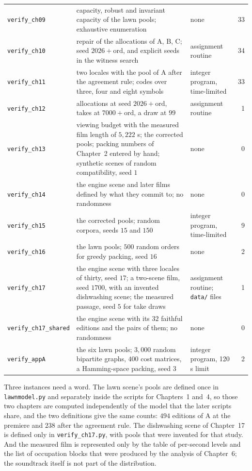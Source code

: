 \documentclass[11pt,twoside,openright]{book}
\theoremstyle{plain}
\theoremstyle{definition}
\theoremstyle{remark}
\begin{document}
\begin{longtable}{@{}>{\raggedright\arraybackslash}p{2.6cm}>{\raggedright\arraybackslash}p{6.0cm}>{\raggedright\arraybackslash}p{2.4cm}r@{}}
\texttt{verify\_ch09} & capacity, robust and invariant capacity of the lawn pools; exhaustive enumeration & none & 33\\
\texttt{verify\_ch10} & repair of the allocations of A, B, C; seed $2026+\mathrm{ord}$, and explicit seeds in the witness search & assignment routine & 34\\
\texttt{verify\_ch11} & two locales with the pool of A after the agreement rule; codes over three, four and eight symbols & integer program, time-limited & 33\\
\texttt{verify\_ch12} & allocations at seed $2026+\mathrm{ord}$, takes at $7000+\mathrm{ord}$, a draw at $99$ & assignment routine & 1\\
\texttt{verify\_ch13} & viewing budget with the measured film length of $5{,}222$ s; the corrected pools; packing numbers of Chapter~2 entered by hand; synthetic scenes of random compatibility, seed $1$ & none & 0\\
\texttt{verify\_ch14} & the engine scene and later films defined by what they commit to; no randomness & none & 0\\
\texttt{verify\_ch15} & the corrected pools; random corpora, seeds $15$ and $150$ & integer program, time-limited & 9\\
\texttt{verify\_ch16} & the lawn pools; $500$ random orders for greedy packing, seed $16$ & none & 2\\
\texttt{verify\_ch17} & the engine scene with three locales of thirty, seed $17$; a two-scene film, seed $1700$, with an invented dishwashing scene; the measured passage, seed $5$ for take draws & assignment routine; \texttt{data/} files & 1\\
\texttt{verify\_ch17\_\allowbreak shared} & the engine scene with its $32$ faithful editions and the pairs of them; no randomness & none & 0\\
\texttt{verify\_appA} & the six lawn pools; $3{,}000$ random bipartite graphs, $400$ cost matrices, a Hamming-space packing, seed $3$ & integer program, 120 s limit & 2\\
\end{longtable}

Three instances need a word. The lawn scene's pools are defined once in \texttt{lawnmodel.py} and separately inside the scripts for Chapters~1 and~4, so those two chapters are computed independently of the model that the later scripts share, and the two definitions give the same counts: $494$ editions of A at the premiere and $238$ after the agreement rule. The dishwashing scene of Chapter~17 is defined only in \texttt{verify\_ch17.py}, with pools that were invented for that study. And the measured film is represented only by the table of per-second levels and the list of occupation blocks that were produced by the analysis of Chapter~6; the soundtrack itself is not part of the distribution.
\end{document}
